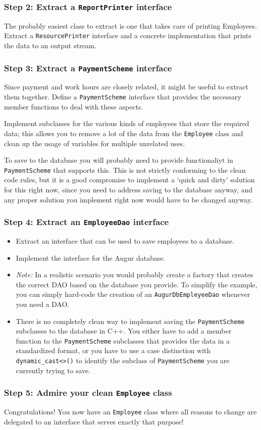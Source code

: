 \documentclass[10pt,aspectratio=169]{beamer}
\begin{document}
\begin{frame}[fragile]
  \frametitle{Step 2: Extract a \texttt{ReportPrinter} interface}

  The probably easiest class to extract is one that takes care of printing
  Employees. Extract a \texttt{ResourcePrinter} interface and a concrete
  implementation that prints the data to an output stream.
\end{frame}

\begin{frame}[fragile]
  \frametitle{Step 3: Extract a \texttt{PaymentScheme} interface}

  Since payment and work hours are closely related, it might be useful to
  extract them together. Define a \texttt{PaymentScheme} interface that provides
  the necessary member functions to deal with these aspects. 
  
  Implement subclasses for the various kinds of employees that store the
  required data; this allows you to remove a lot of the data from the
  \texttt{Employee} class and clean up the usage of variables for multiple
  unrelated uses.

  To save to the database you will probably need to provide functionaliyt in
  \texttt{PaymentScheme} that supports this. This is not strictly conforming to
  the clean code rules, but it is a good compromise to implement a `quick and
  dirty' solution for this right now, since you need to address saving to the
  database anyway, and any proper solution you implement right now would have to
  be changed anyway.
\end{frame}

\begin{frame}[fragile]
  \frametitle{Step 4: Extract an \texttt{EmployeeDao} interface}

  \begin{itemize}
    \item Extract an interface that can be used to save employees to a database.
    \item Implement the interface for the Augur database.
    \item \textit{Note:} In a realistic scenario you would probably create a
      factory  that creates the correct DAO based on the database you provide.
      To simplify the example, you can simply hard-code the creation of an
      \texttt{AugurDbEmpleyeeDao} whenever you need a DAO.
    \item There is no completely clean way to implement saving the
    \texttt{PaymentScheme} subclasses to the database in C++. You either have to
    add a member function to the \texttt{PaymentScheme} subclasses that provides
    the data in a standardized format, or you have to use a case distinction
    with \verb|dynamic_cast<>()| to identify the subclass of
    \texttt{PaymentScheme} you are currently trying to save.
  \end{itemize} 
\end{frame}

\begin{frame}[fragile]
  \frametitle{Step 5: Admire your clean \texttt{Employee} class}

  Congratulations! You now have an \texttt{Employee} class where all reasons to
  change are delegated to an interface that serves exactly that purpose!
\end{frame}
\end{document}
